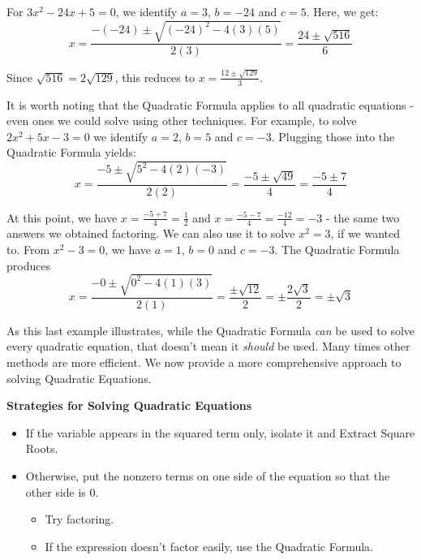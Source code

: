 \documentclass{ximera}
\begin{document}
{{{{For $3x^2 - 24x + 5 = 0$, we identify $a = 3$, $b = -24$ and $c = 5$.  Here, we get: \[ x = \dfrac{-(-24) \pm \sqrt{(-24)^2 - 4(3)(5)}}{2(3)} = \dfrac{24 \pm \sqrt{516}}{6} \]

Since $\sqrt{516} = 2\sqrt{129}$, this reduces to  $x = \frac{12 \pm \sqrt{129}}{3}$. 

\smallskip

It is worth noting that the Quadratic Formula applies to all quadratic equations - even ones we could solve using other techniques.  For example, to solve $2x^2 + 5x - 3 = 0$  we identify $a = 2$, $b = 5$ and $c = -3$.  Plugging those into the Quadratic Formula yields: \[ x = \dfrac{-5 \pm \sqrt{5^2 - 4(2)(-3)}}{2(2)} = \dfrac{-5 \pm \sqrt{49}}{4} = \dfrac{-5 \pm 7}{4} \]

At this point, we have $x = \frac{-5+7}{4} = \frac{1}{2}$ and $x = \frac{-5-7}{4} = \frac{-12}{4} = -3$ - the same two answers we obtained factoring.  We can also use it to solve $x^2 = 3$, if we wanted to.  From $x^2 -3 = 0$, we have $a = 1$, $b = 0$ and $c = -3$.  The Quadratic Formula produces \[ x = \dfrac{-0 \pm \sqrt{0^2 - 4(1)(3)}}{2(1)} = \dfrac{\pm\sqrt{12}}{2} = \pm \dfrac{2\sqrt{3}}{2} = \pm \sqrt{3}\]

As this last example illustrates, while the  Quadratic Formula \textit{can} be used to solve every quadratic equation, that doesn't mean it \textit{should} be used.  Many times other methods are more efficient.  We now provide a more comprehensive approach to solving Quadratic Equations.  

\medskip

\label{solvequadraticeqns}

\colorbox{ResultColor}{\bbm
\centerline{\textbf{Strategies for Solving Quadratic Equations}}

\begin{itemize}

\item  If the variable appears in the squared term only, isolate it and Extract Square Roots.
\item  Otherwise, put the nonzero terms on one side of the equation so that the other side is $0$.
\begin{itemize}
\item  Try factoring.  
\item  If the expression doesn't factor easily, use the Quadratic Formula.

\end{itemize}
\end{itemize}

}}}}}
\end{document}
